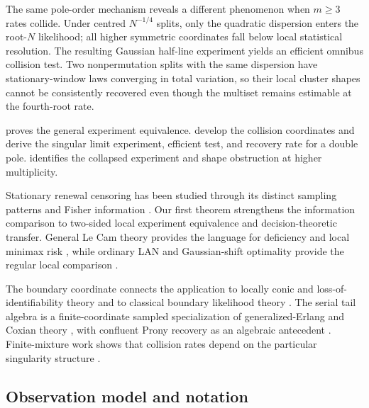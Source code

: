 The same pole-order mechanism reveals a different phenomenon when \(m\ge3\)
rates collide.  Under centred \(N^{-1/4}\) splits, only the quadratic
dispersion enters the root-\(N\) likelihood; all higher symmetric coordinates
fall below local statistical resolution.  The resulting Gaussian half-line
experiment yields an efficient omnibus collision test.  Two nonpermutation
splits with the same dispersion have stationary-window laws converging in
total variation, so their local cluster shapes cannot be consistently
recovered even though the multiset remains estimable at the fourth-root rate.

 proves the general experiment equivalence.
 develop
the collision coordinates and derive the singular limit experiment, efficient
test, and recovery rate for a double pole.  
identifies the collapsed experiment and shape obstruction at higher
multiplicity.

Stationary renewal censoring has been studied through its distinct sampling
patterns and Fisher information \cite{GillKeiding2010RenewalSampling,
ZhaoNagaraja2011WindowCensoredRenewal}.  Our first theorem strengthens the
information comparison to two-sided local experiment equivalence and
decision-theoretic transfer.  General Le Cam theory provides the language for
deficiency and local minimax risk \cite{LeCamYang2000}, while ordinary LAN and
Gaussian-shift optimality provide the regular local comparison
\cite{vanDerVaart1998AsymptoticStatistics}.

The boundary coordinate connects the application to locally conic and
loss-of-identifiability theory
\cite{DacunhaCastelleGassiat1997LocallyConic,LiuShao2003LossIdentifiability}
and to classical boundary likelihood theory
\cite{Chernoff1954LikelihoodRatio,SelfLiang1987NonstandardLRT}.  The serial
tail algebra is a finite-coordinate sampled specialization of
generalized-Erlang and Coxian theory
\cite{HeZhang2008MinimalCoxian,HeZhang2009GeneralizedErlang}, with confluent
Prony recovery as an algebraic antecedent
\cite{BatenkovYomdin2013ConfluentProny,KunisRoemerVonDerOhe2020Prony}.
Finite-mixture work shows that collision rates depend on the particular
singularity structure
\cite{Chen1995FiniteMixtureRate,HeinrichKahn2018FiniteMixtureMinimax,
HoNguyen2019SingularityStructures}.

\subsection*{Observation model and notation}

